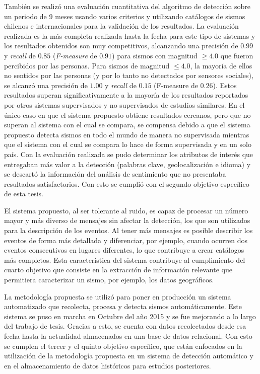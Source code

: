 \begin{conclusion}
También se realizó una evaluación cuantitativa del algoritmo de detección sobre un periodo de 9 meses usando varios criterios y utilizando catálogos de sismos chilenos e internacionales para la validación de los resultados.  
%
La evaluación realizada es la más completa realizada hasta la fecha para este tipo de sistemas y %
%
los resultados obtenidos son muy competitivos, alcanzando una precisión de $0.99$ y \textit{recall} de $0.85$ (\textit{F-measure} de $0.91$) para sismos con magnitud $\geq 4.0$ que fueron percibidos por las personas. 
%
Para sismos de magnitud $\leq 4.0$, la mayoría de ellos no sentidos por las personas (y por lo tanto no detectados por sensores sociales), se alcanzó una precisión de $1.00$ y \textit{recall} de $0.15$ (F-measure de $0.26$).
%
Estos resultados superan significativamente a la mayoría de los resultados reportados por otros sistemas supervisados y no supervisados de estudios similares.
%
En el único caso en que el sistema propuesto obtiene resultados cercanos, pero que no superan al sistema con el cual se compara, se compensa debido a que el sistema propuesto detecta sismos en todo el mundo de manera no supervisada mientras que el sistema con el cual se compara lo hace de forma supervisada y en un solo país.
%
Con la evaluación realizada se pudo determinar los atributos de interés que entregaban más valor a la detección (palabras clave, geolocalización e idioma) y se descartó la información del análisis de sentimiento que no presentaba resultados satisfactorios. 
% 
Con esto se cumplió con el segundo objetivo específico de esta tesis. 


El sistema propuesto, al ser tolerante al ruido, es capaz de procesar un número mayor y más diverso de mensajes sin afectar la detección, los que son utilizados para la descripción de los eventos. 
%
Al tener más mensajes es posible describir los eventos de forma más detallada y diferenciar, por ejemplo, cuando ocurren dos eventos consecutivos en lugares diferentes, lo que contribuye a crear catálogos más completos. 
%
Esta característica del sistema contribuye al cumplimiento del cuarto objetivo que consiste en la extracción de información relevante que permitiera caracterizar un sismo, por ejemplo, los datos geográficos.


La metodología propuesta se utilizó para poner en producción un sistema automatizado que recolecta, procesa y detecta sismos automáticamente. 
%
Este sistema se puso en marcha en Octubre del año 2015 y se fue mejorando a lo largo del trabajo de tesis. 
%
Gracias a esto, se cuenta con datos recolectados desde esa fecha hasta la actualidad almacenados en una base de datos relacional.
%
Con esto se cumplen el tercer y el quinto objetivo específico, que están enfocados en la utilización de la metodología propuesta en un sistema de detección automático y en el almacenamiento de datos históricos para estudios posteriores. 




\end{conclusion}
